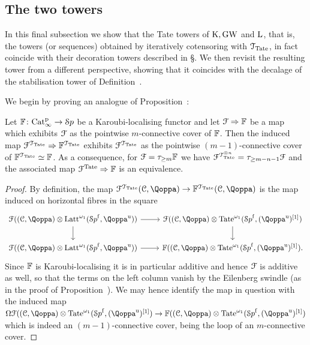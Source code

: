 \subsection{The two towers}
\label{subsection:the-two-towers}%

In this final subsection we show that the Tate towers of $\operatorname K,\operatorname{GW}$ and $\operatorname L$, that is, the towers (or sequences) obtained by iteratively cotensoring with $\mathcal{T}_{\operatorname{Tate}}$, in fact coincide with their decoration towers described in \S{}. We then revisit the resulting tower from a different perspective, showing that it coincides with the decalage of the stabilisation tower of Definition~.

We begin by proving an analogue of Proposition~:

\begin{proposition}
\label{proposition:connective-covers-tate}%
Let $\mathbb{F}\colon \mathrm{Cat}^{\mathrm p}_\infty \to {\mathcal Sp}$ be a Karoubi-localising functor and let $\mathcal{F} \Rightarrow \mathbb{F}$ be a map which exhibits $\mathcal{F}$ as the pointwise $m$-connective cover of $\mathbb{F}$. Then the induced map $\mathcal{F}^{\mathcal{T}_{\operatorname{Tate}}}\Rightarrow \mathbb{F}^{\mathcal{T}_{\operatorname{Tate}}}$ exhibits $\mathcal{F}^{\mathcal{T}_{\operatorname{Tate}}}$ as the pointwise $(m-1)$-connective cover of $\mathbb{F}^{\mathcal{T}_{\operatorname{Tate}}} \simeq \mathbb{F}$. 
As a consequence, for $\mathcal{F} = \tau_{\geq m}\mathbb{F}$ we have $\mathcal{F}^{\mathcal{T}^{\otimes n}_{\operatorname{Tate}}} = \tau_{\geq m-n-1}\mathcal{F}$ and the associated map
$\mathcal{F}^{\operatorname{Tate}} \Rightarrow \mathbb{F}$ is an equivalence.
\end{proposition}
\begin{proof}
By definition, the map $\F^{\T_{\Tate}}(\C,\QF)\to \FF^{\T_{\Tate}}(\C,\QF)$ is the map induced on horizontal fibres in the square
\[
\begin{tikzcd}
\F((\C,\QF) \otimes \Latt^{\omega_1}(\Spaf, \QF^{\uni}))\ar[r]\ar[d] & \F((\C,\QF) \otimes \Tate^{\omega_1}(\Spaf, (\QF^{\uni})\qshift{1}) \ar[d] \\
\F((\C,\QF) \otimes \Latt^{\omega_1}(\Spaf, \QF^{\uni}))\ar[r] & \FF((\C,\QF) \otimes \Tate^{\omega_1}(\Spaf, (\QF^{\uni})\qshift{1}) .
\end{tikzcd}
\]
Since $\mathbb{F}$ is Karoubi-localising it is in particular additive and hence $\mathcal{F}$ is additive as well, so that the terms on the left column vanish by the Eilenberg swindle (as in the proof of Proposition~). We may hence identify the map in question with the induced map $\Om\F((\C,\QF) \otimes \Tate^{\omega_1}(\Spaf, (\QF^{\uni})\qshift{1}) \to \FF((\C,\QF) \otimes \Tate^{\omega_1}(\Spaf, (\QF^{\uni})\qshift{1})$ which is indeed an $(m-1)$-connective cover, being the loop of an $m$-connective cover. 
\end{proof}

